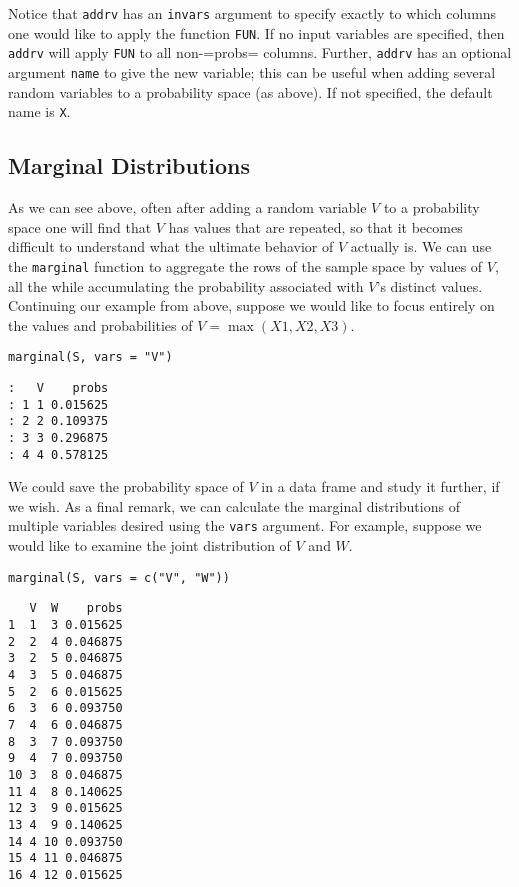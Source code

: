Notice that \texttt{addrv} has an \texttt{invars} argument to specify exactly to
which columns one would like to apply the function \texttt{FUN}. If no input
variables are specified, then \texttt{addrv} will apply \texttt{FUN} to all
non-=probs= columns. Further, \texttt{addrv} has an optional argument \texttt{name}
to give the new variable; this can be useful when adding several
random variables to a probability space (as above). If not specified,
the default name is \texttt{X}.

\subsection{Marginal Distributions}
\label{sec-4-9-2}

As we can see above, often after adding a random variable \(V\) to a
probability space one will find that \(V\) has values that are
repeated, so that it becomes difficult to understand what the ultimate
behavior of \(V\) actually is. We can use the \texttt{marginal} function to
aggregate the rows of the sample space by values of \(V\), all the
while accumulating the probability associated with \(V\)'s distinct
values. Continuing our example from above, suppose we would like to
focus entirely on the values and probabilities of
\(V=\max(X1,X2,X3)\).

\begin{verbatim}
marginal(S, vars = "V") 
\end{verbatim}

\begin{verbatim}
:   V    probs
: 1 1 0.015625
: 2 2 0.109375
: 3 3 0.296875
: 4 4 0.578125
\end{verbatim}

We could save the probability space of \(V\) in a data frame and study
it further, if we wish. As a final remark, we can calculate the
marginal distributions of multiple variables desired using the \texttt{vars}
argument. For example, suppose we would like to examine the joint
distribution of \(V\) and \(W\).

\begin{verbatim}
marginal(S, vars = c("V", "W")) 
\end{verbatim}

\begin{verbatim}
   V  W    probs
1  1  3 0.015625
2  2  4 0.046875
3  2  5 0.046875
4  3  5 0.046875
5  2  6 0.015625
6  3  6 0.093750
7  4  6 0.046875
8  3  7 0.093750
9  4  7 0.093750
10 3  8 0.046875
11 4  8 0.140625
12 3  9 0.015625
13 4  9 0.140625
14 4 10 0.093750
15 4 11 0.046875
16 4 12 0.015625
\end{verbatim}


